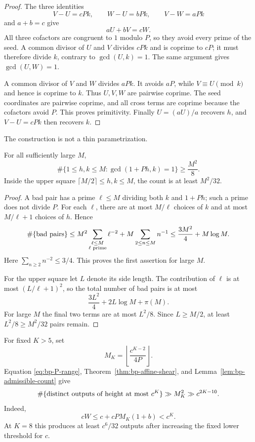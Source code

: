 \begin{proof}
The three identities
\[
 V-U=cPk,\qquad W-U=bPk,\qquad V-W=aPk
\]
and $a+b=c$ give
\[
 aU+bV=cW.
\]
All three cofactors are congruent to $1$ modulo $P$, so they avoid every
prime of the seed.  A common divisor of $U$ and $V$ divides $cPk$ and is
coprime to $cP$; it must therefore divide $k$, contrary to
$\gcd(U,k)=1$.  The same argument gives $\gcd(U,W)=1$.

A common divisor of $V$ and $W$ divides $aPk$.  It avoids $aP$, while
$V\equiv U\pmod{k}$ and hence is coprime to $k$.  Thus $U,V,W$ are pairwise
coprime.  The seed coordinates are pairwise coprime, and all cross terms are
coprime because the cofactors avoid $P$.  This proves primitivity.
Finally $U=(aU)/a$ recovers $h$, and $V-U=cPk$ then recovers $k$.
\end{proof}

The construction is not a thin parametrization.

\begin{lemma}
\label{lem:bp-admissible-count}
For all sufficiently large $M$,
\[
 \#\{1\leq h,k\leq M:\gcd(1+Ph,k)=1\}\geq \frac{M^2}{8}.
\]
Inside the upper square $\lceil M/2\rceil\leq h,k\leq M$, the count is at
least $M^2/32$.
\end{lemma}

\begin{proof}
A bad pair has a prime $\ell\leq M$ dividing both $k$ and $1+Ph$; such a
prime does not divide $P$.  For each $\ell$, there are at most $M/\ell$
choices of $k$ and at most $M/\ell+1$ choices of $h$.  Hence
\[
 \#\{\hbox{bad pairs}\}
 \leq M^2\sum_{\substack{\ell\leq M\\ \ell\text{ prime}}}\ell^{-2}
       +M\sum_{2\leq n\leq M}n^{-1}
 \leq \frac{3M^2}{4}+M\log M.
\]
Here $\sum_{n\geq2}n^{-2}\leq3/4$.  This proves the first assertion for
large $M$.

For the upper square let $L$ denote its side length.  The contribution of
$\ell$ is at most $(L/\ell+1)^2$, so the total number of bad pairs is at
most
\[
                       \frac{3L^2}{4}+2L\log M+\pi(M).
\]
For large $M$ the final two terms are at most $L^2/8$.  Since $L\geq M/2$,
at least $L^2/8\geq M^2/32$ pairs remain.
\end{proof}

For fixed $K>5$, set
\[
                  M_K=\left\lfloor\frac{c^{K-2}}{4P}\right\rfloor.
\]
Equation \eqref{eq:bp-P-range}, Theorem~\ref{thm:bp-affine-shear}, and
Lemma~\ref{lem:bp-admissible-count} give
\begin{equation}\label{eq:bp-raw-fibre}
 \#\{\hbox{distinct outputs of height at most }c^K\}
              \gg M_K^2\gg c^{2K-10}.
\end{equation}
Indeed,
\[
 cW\leq c+cPM_K(1+b)<c^K.
\]
At $K=8$ this produces at least $c^6/32$ outputs after increasing the fixed
lower threshold for $c$.

